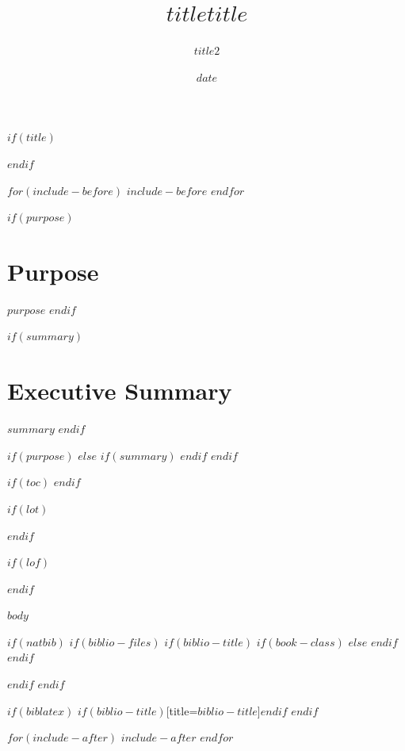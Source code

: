 \documentclass[14,a4paper,$for(classoption)$$classoption$$sep$,$endfor$]{$documentclass$}
\title{$title$\vspace{-5mm}}
\title{$title$\vspace{-5mm}}
\title{}
\subtitle{$title2$\vspace{-5mm}}
\date{\vspace{-10mm}$date$\vspace{12mm}}
\date{}
\begin{document}
$if(title)$
  \maketitle\thispagestyle{fancy}
$endif$

$for(include-before)$
  $include-before$
$endfor$

\vfill
$if(purpose)$
  \section*{\color{titleblack}Purpose\vspace{-5mm}}
  $purpose$
$endif$

$if(summary)$
  \section*{\color{titleblack}Executive Summary\vspace{-5mm}}
  $summary$
$endif$

$if(purpose)$
  \newpage
  $else$
    $if(summary)$
      \newpage
    $endif$
$endif$

$if(toc)$
  {
  \hypersetup{linkcolor=black}
  \setcounter{tocdepth}{$toc-depth$}
  \tableofcontents
  }
$endif$

$if(lot)$
  \listoftables
$endif$

$if(lof)$
  \listoffigures
$endif$

$body$

$if(natbib)$
  $if(biblio-files)$
    $if(biblio-title)$
      $if(book-class)$
        \renewcommand\bibname{$biblio-title$}
      $else$
        \renewcommand\refname{$biblio-title$}
      $endif$
    $endif$
  
  $endif$
$endif$

$if(biblatex)$
  \printbibliography$if(biblio-title)$[title=$biblio-title$]$endif$
$endif$

$for(include-after)$
  $include-after$
$endfor$
\end{document}

